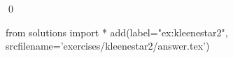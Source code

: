 
\begin{ex} 
  \label{ex:kleenestar2}
  
  \qed
\end{ex} 
\begin{python0}
from solutions import *
add(label="ex:kleenestar2",
    srcfilename='exercises/kleenestar2/answer.tex') 
\end{python0}
